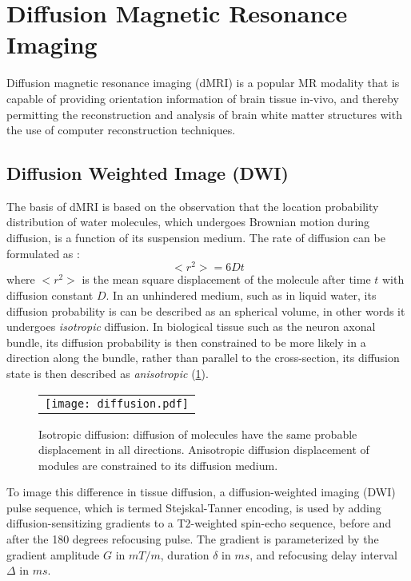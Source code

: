 \section{Diffusion Magnetic Resonance Imaging}

Diffusion magnetic resonance imaging (dMRI) is a popular MR modality that is capable of providing orientation information of brain tissue in-vivo, and thereby permitting the reconstruction and analysis of brain white matter structures with the use of computer reconstruction techniques. 

\subsection{Diffusion Weighted Image (DWI)}

The basis of dMRI is based on the observation that the location probability distribution of water molecules, which undergoes Brownian motion during diffusion, is a function of its suspension medium. The rate of diffusion can be formulated as \cite{Mukherjee2008}: 
\begin{equation}
<r^2>=6Dt
\end{equation}
where $<r^2>$ is the mean square displacement of the molecule after time $t$ with diffusion constant $D$. In an unhindered medium, such as in liquid water, its diffusion probability is can be described as an spherical volume, in other words it undergoes \textit{isotropic} diffusion. In biological tissue such as the neuron axonal bundle, its diffusion probability is then constrained to be more likely in a direction along the bundle, rather than parallel to the cross-section, its diffusion state is then described as \textit{anisotropic} (\ref{fig:diffusion}). 

\begin{figure}[ht]
\begin{center}
\begin{tabular}{c}
\texttt{[image: diffusion.pdf]}
\end{tabular}
\caption{Isotropic diffusion: diffusion of molecules have the same probable displacement in all directions. Anisotropic diffusion displacement of modules are constrained to its diffusion medium.}
\label{fig:diffusion}
\end{center}
\end{figure}

To image this difference in tissue diffusion, a diffusion-weighted imaging (DWI) pulse sequence, which is termed Stejskal-Tanner encoding, is used by adding diffusion-sensitizing gradients to a T2-weighted spin-echo sequence, before and after the 180 degrees refocusing pulse. The gradient is parameterized by the gradient amplitude $G$ in $mT/m$, duration $\delta$ in $ms$, and refocusing delay interval $\Delta$ in $ms$. 

